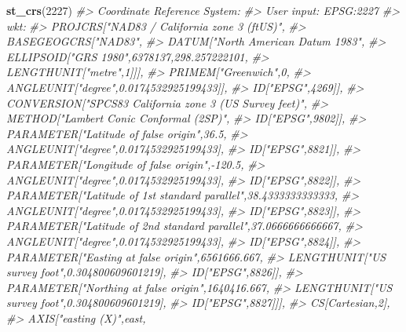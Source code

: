 \documentclass[
  12pt,
]{book}
\newenvironment{Shaded}{\begin{snugshade}}{\end{snugshade}}
\newcommand{\CommentTok}[1]{\textcolor[rgb]{0.37,0.37,0.37}{\textit{#1}}}
\newcommand{\DecValTok}[1]{\textcolor[rgb]{0.06,0.06,0.06}{#1}}
\newcommand{\KeywordTok}[1]{\textcolor[rgb]{0.27,0.27,0.27}{\textbf{#1}}}
\newcommand{\NormalTok}[1]{#1}
\begin{document}
\begin{Shaded}
\begin{Highlighting}[]
\KeywordTok{st\_crs}\NormalTok{(}\DecValTok{2227}\NormalTok{)}
\CommentTok{\#\textgreater{} Coordinate Reference System:}
\CommentTok{\#\textgreater{}   User input: EPSG:2227 }
\CommentTok{\#\textgreater{}   wkt:}
\CommentTok{\#\textgreater{} PROJCRS["NAD83 / California zone 3 (ftUS)",}
\CommentTok{\#\textgreater{}     BASEGEOGCRS["NAD83",}
\CommentTok{\#\textgreater{}         DATUM["North American Datum 1983",}
\CommentTok{\#\textgreater{}             ELLIPSOID["GRS 1980",6378137,298.257222101,}
\CommentTok{\#\textgreater{}                 LENGTHUNIT["metre",1]]],}
\CommentTok{\#\textgreater{}         PRIMEM["Greenwich",0,}
\CommentTok{\#\textgreater{}             ANGLEUNIT["degree",0.0174532925199433]],}
\CommentTok{\#\textgreater{}         ID["EPSG",4269]],}
\CommentTok{\#\textgreater{}     CONVERSION["SPCS83 California zone 3 (US Survey feet)",}
\CommentTok{\#\textgreater{}         METHOD["Lambert Conic Conformal (2SP)",}
\CommentTok{\#\textgreater{}             ID["EPSG",9802]],}
\CommentTok{\#\textgreater{}         PARAMETER["Latitude of false origin",36.5,}
\CommentTok{\#\textgreater{}             ANGLEUNIT["degree",0.0174532925199433],}
\CommentTok{\#\textgreater{}             ID["EPSG",8821]],}
\CommentTok{\#\textgreater{}         PARAMETER["Longitude of false origin",{-}120.5,}
\CommentTok{\#\textgreater{}             ANGLEUNIT["degree",0.0174532925199433],}
\CommentTok{\#\textgreater{}             ID["EPSG",8822]],}
\CommentTok{\#\textgreater{}         PARAMETER["Latitude of 1st standard parallel",38.4333333333333,}
\CommentTok{\#\textgreater{}             ANGLEUNIT["degree",0.0174532925199433],}
\CommentTok{\#\textgreater{}             ID["EPSG",8823]],}
\CommentTok{\#\textgreater{}         PARAMETER["Latitude of 2nd standard parallel",37.0666666666667,}
\CommentTok{\#\textgreater{}             ANGLEUNIT["degree",0.0174532925199433],}
\CommentTok{\#\textgreater{}             ID["EPSG",8824]],}
\CommentTok{\#\textgreater{}         PARAMETER["Easting at false origin",6561666.667,}
\CommentTok{\#\textgreater{}             LENGTHUNIT["US survey foot",0.304800609601219],}
\CommentTok{\#\textgreater{}             ID["EPSG",8826]],}
\CommentTok{\#\textgreater{}         PARAMETER["Northing at false origin",1640416.667,}
\CommentTok{\#\textgreater{}             LENGTHUNIT["US survey foot",0.304800609601219],}
\CommentTok{\#\textgreater{}             ID["EPSG",8827]]],}
\CommentTok{\#\textgreater{}     CS[Cartesian,2],}
\CommentTok{\#\textgreater{}         AXIS["easting (X)",east,}

\end{Highlighting}
\end{Shaded}
\end{document}
